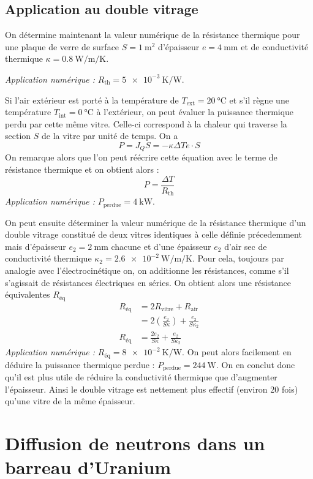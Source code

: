\documentclass[a4paper,12pt]{article}
\begin{document}
\subsection{Application au double vitrage}

On détermine maintenant la valeur numérique de la résistance thermique pour une plaque de verre de surface ${S = \SI{1}{\metre\squared}}$ d'épaisseur ${e=\SI{4}{\milli\metre}}$ et de conductivité thermique ${\kappa = \SI{0.8}{\watt\per\metre\per\kelvin}}$.

\noindent \emph{Application numérique : } $R_\text{th} = \SI{5e-3}{\kelvin\per\watt}$.

Si l'air extérieur est porté à la température de ${T_\text{ext} = \SI{20}{\celsius}}$ et s'il règne une température ${T_\text{int} = \SI{0}{\celsius}}$ à l'extérieur, on peut évaluer la puissance thermique perdu par cette même vitre. Celle-ci correspond à la chaleur qui traverse la section $S$ de la vitre par unité de temps. On a
\begin{equation}
	P = J_Q S = -\kappa{\Delta T}{e} \cdot S
\end{equation}
On remarque alors que l'on peut réécrire cette équation avec le terme de résistance thermique et on obtient alors :
\begin{equation}
	P = \frac{\Delta T}{R_\text{th}}
\end{equation}
\emph{Application numérique : } $P_\text{perdue} = \SI{4}{\kilo\watt}$.

On peut ensuite déterminer la valeur numérique de la résistance thermique d'un double vitrage constitué de deux vitres identiques à celle définie précedemment mais d'épaisseur ${e_2 = \SI{2}{\milli\metre}}$ chacune et d'une épaisseur $e_2$ d'air sec de conductivité thermique ${\kappa_2 = \SI{2.6e-2}{\watt\per\metre\per\kelvin}}$. Pour cela, toujours par analogie avec l'électrocinétique on, on additionne les résistances, comme s'il s'agissait de résistances électriques en séries. On obtient alors une résistance équivalentes $R_\text{éq}$
\begin{equation}
	\begin{split}
		R_\text{éq} 	&= 2R_\text{vitre} + R_\text{air}\\
				&= 2 \left( \frac{e_2}{S\kappa} \right) + \frac{e_2}{S\kappa_2}\\
		R_\text{éq}	&= \frac{2e_2}{S\kappa} + \frac{e_2}{S\kappa_2}
	\end{split}
\end{equation}
\emph{Application numérique : } $R_\text{éq} = \SI{8e-2}{\kelvin\per\watt}$. On peut alors facilement en déduire la puissance thermique perdue : ${P_\text{perdue} = \SI{244}{\watt}}$. On en conclut donc qu'il est plus utile de réduire la conductivité thermique que d'augmenter l'épaisseur. Ainsi le double vitrage est nettement plus effectif (environ 20 fois) qu'une vitre de la même épaisseur.

\section{Diffusion de neutrons dans un barreau d'Uranium}
\end{document}
